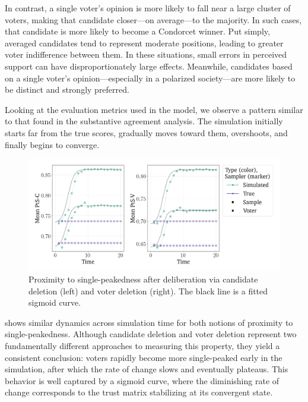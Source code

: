 In contrast, a single voter's opinion is more likely to fall near a large cluster of voters, making that candidate closer—on average—to the majority. In such cases, that candidate is more likely to become a Condorcet winner. Put simply, averaged candidates tend to represent moderate positions, leading to greater voter indifference between them. In these situations, small errors in perceived support can have disproportionately large effects. Meanwhile, candidates based on a single voter's opinion—especially in a polarized society—are more likely to be distinct and strongly preferred.

Looking at the evaluation metrics used in the model, we observe a pattern similar to that found in the substantive agreement analysis. The simulation initially starts far from the true scores, gradually moves toward them, overshoots, and finally begins to converge.

\begin{figure}[htbp]
	\centering
	\vspace{-9pt}
	\includegraphics[width=\textwidth]{Figures/pst_measures.png}
	\caption{Proximity to single-peakedness after deliberation via candidate deletion (left) and voter deletion (right). The black line is a fitted sigmoid curve.}
	\label{fig:degroot_single_peaked}
\end{figure}

 shows similar dynamics across simulation time for both notions of proximity to single-peakedness. Although candidate deletion and voter deletion represent two fundamentally different approaches to measuring this property, they yield a consistent conclusion: voters rapidly become more single-peaked early in the simulation, after which the rate of change slows and eventually plateaus. This behavior is well captured by a sigmoid curve, where the diminishing rate of change corresponds to the trust matrix stabilizing at its convergent state.
